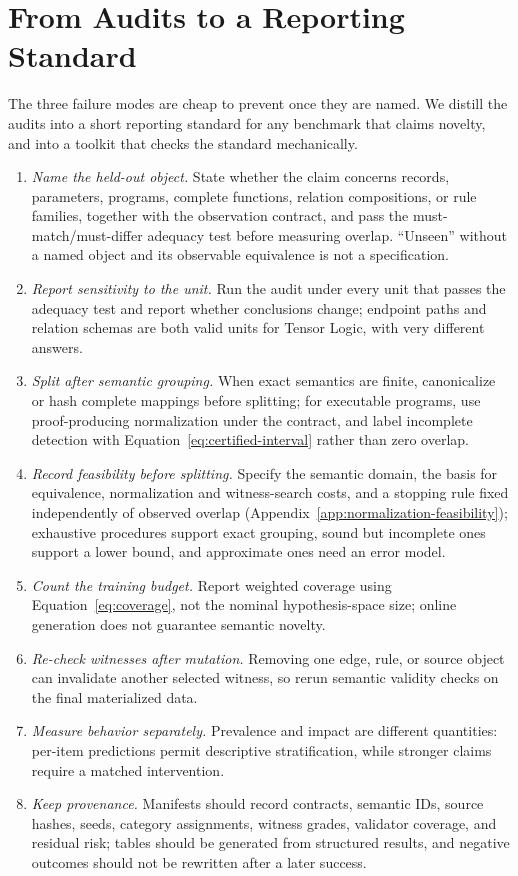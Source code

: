 \documentclass[twoside,11pt]{article}
\begin{document}
\section{From Audits to a Reporting Standard}
\label{sec:recommendations}

The three failure modes are cheap to prevent once they are named.  We
distill the audits into a short reporting standard for any benchmark that
claims novelty, and into a toolkit that checks the standard mechanically.

\begin{enumerate}
\item \emph{Name the held-out object.}  State whether the claim concerns
records, parameters, programs, complete functions, relation compositions, or
rule families, together with the observation contract, and pass the
must-match/must-differ adequacy test before measuring overlap.  ``Unseen''
without a named object and its observable equivalence is not a specification.
\item \emph{Report sensitivity to the unit.}  Run the audit under every unit
that passes the adequacy test and report whether conclusions change; endpoint
paths and relation schemas are both valid units for Tensor Logic, with very
different answers.
\item \emph{Split after semantic grouping.}  When exact semantics are finite,
canonicalize or hash complete mappings before splitting; for executable
programs, use proof-producing normalization under the contract, and label
incomplete detection with Equation~\ref{eq:certified-interval} rather than
zero overlap.
\item \emph{Record feasibility before splitting.}  Specify the semantic
domain, the basis for equivalence, normalization and witness-search costs, and
a stopping rule fixed independently of observed overlap
(Appendix~\ref{app:normalization-feasibility}); exhaustive procedures support
exact grouping, sound but incomplete ones support a lower bound, and
approximate ones need an error model.
\item \emph{Count the training budget.}  Report weighted coverage using
Equation~\ref{eq:coverage}, not the nominal hypothesis-space size; online
generation does not guarantee semantic novelty.
\item \emph{Re-check witnesses after mutation.}  Removing one edge, rule, or
source object can invalidate another selected witness, so rerun semantic
validity checks on the final materialized data.
\item \emph{Measure behavior separately.}  Prevalence and impact are different
quantities: per-item predictions permit descriptive stratification, while
stronger claims require a matched intervention.
\item \emph{Keep provenance.}  Manifests should record contracts, semantic
IDs, source hashes, seeds, category assignments, witness grades, validator
coverage, and residual risk; tables should be generated from structured
results, and negative outcomes should not be rewritten after a later success.
\end{enumerate}
\end{document}
